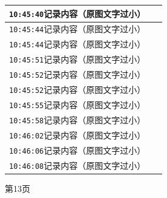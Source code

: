 \documentclass[UTF8,10pt,a4paper,fontset=fandol]{ctexart}
\newcommand{\fieldvalue}[1]{#1}
\begin{document}
\begin{minipage}[t]{0.48\linewidth}
\begin{tabular}{|p{0.20\linewidth}|p{0.72\linewidth}|}
\multicolumn{2}{|l|}{
\fieldvalue{\texttt{10:45:40}\quad 记录内容（原图文字过小）}} \\ \hline
\multicolumn{2}{|l|}{
\fieldvalue{\texttt{10:45:44}\quad 记录内容（原图文字过小）}} \\ \hline
\multicolumn{2}{|l|}{
\fieldvalue{\texttt{10:45:44}\quad 记录内容（原图文字过小）}} \\ \hline
\multicolumn{2}{|l|}{
\fieldvalue{\texttt{10:45:51}\quad 记录内容（原图文字过小）}} \\ \hline
\multicolumn{2}{|l|}{
\fieldvalue{\texttt{10:45:52}\quad 记录内容（原图文字过小）}} \\ \hline
\multicolumn{2}{|l|}{
\fieldvalue{\texttt{10:45:52}\quad 记录内容（原图文字过小）}} \\ \hline
\multicolumn{2}{|l|}{
\fieldvalue{\texttt{10:45:55}\quad 记录内容（原图文字过小）}} \\ \hline
\multicolumn{2}{|l|}{
\fieldvalue{\texttt{10:45:58}\quad 记录内容（原图文字过小）}} \\ \hline
\multicolumn{2}{|l|}{
\fieldvalue{\texttt{10:46:02}\quad 记录内容（原图文字过小）}} \\ \hline
\multicolumn{2}{|l|}{
\fieldvalue{\texttt{10:46:06}\quad 记录内容（原图文字过小）}} \\ \hline
\multicolumn{2}{|l|}{
\fieldvalue{\texttt{10:46:08}\quad 记录内容（原图文字过小）}} \\ \hline
\end{tabular}

\vspace{2pt}
第13页
\end{minipage}
\hfill
\end{document}

